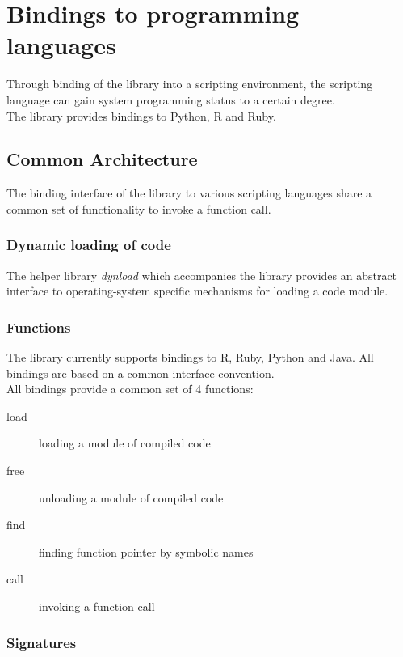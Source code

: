 \newpage
\section{Bindings to programming languages}

Through binding of the  library into a scripting environment,
the scripting language can gain system programming status to a certain degree.\\
The  library provides bindings to Python, R and Ruby.

\subsection{Common Architecture}

The binding interface of the  library to various scripting
languages share a common set of functionality to invoke a function call.

\subsubsection{Dynamic loading of code}

The helper library \emph{dynload} which accompanies the 
library provides an abstract interface to operating-system specific mechanisms
for loading a code module.

\subsubsection{Functions}

The  library currently supports bindings to R, Ruby, Python
and Java. All bindings are based on a common interface convention.\\
All bindings provide a common set of 4 functions:
\begin{description}
\item [load] loading a module of compiled code
\item [free] unloading a module of compiled code
\item [find] finding function pointer by symbolic names
\item [call] invoking a function call
\end{description}

\pagebreak

\subsubsection{Signatures}

